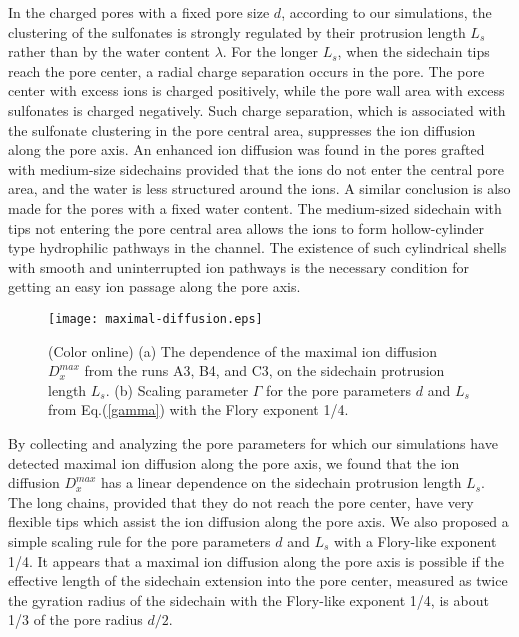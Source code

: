 \documentclass[3p,english,preprint]{elsarticle}
\begin{document}
In the charged pores with  a fixed pore size $d$, according to our simulations, 
the clustering of the sulfonates is strongly regulated
 by their protrusion length $L_s$ rather than by
the  water content $\lambda$.  
For the longer $L_s$, when the sidechain tips reach the pore center,   
a radial charge separation occurs in the pore. The pore center 
with excess ions is  charged positively, while the pore  wall area 
with excess sulfonates is charged negatively. Such  
 charge separation, which is associated with 
the sulfonate clustering in the pore central area,
 suppresses the ion diffusion along the pore axis. 
 An enhanced ion diffusion was found in  
the pores grafted with  medium-size sidechains provided that 
the  ions do not enter the central pore area, and the water is less structured 
around the ions. 
A similar conclusion is also made for the pores with a fixed water content. 
The medium-sized sidechain with tips not entering  the pore central area 
  allows the ions to form  hollow-cylinder type hydrophilic pathways in the 
channel. The existence of such cylindrical shells with smooth 
and uninterrupted 
ion pathways is the necessary condition for getting  
an easy  ion passage along the pore axis.

\begin{figure}[!ht]
\begin{center}
\texttt{[image: maximal-diffusion.eps]}
\end{center}
\vspace{-0.7cm}
\caption{(Color online) 
(a) The dependence of the maximal ion diffusion 
$D_x^{max}$ from the runs A3, B4, and C3, on the sidechain protrusion 
length $L_s$. (b) Scaling parameter $\Gamma$  for the pore parameters $d$ and $L_s$
from Eq.(\ref{gamma}) with the Flory exponent 1/4. 
 \label{fig-16-new}}
\end{figure}


By collecting and analyzing the pore parameters for which our simulations have detected 
 maximal ion diffusion along the pore axis, we found that the
 ion diffusion $D_x^{max}$ has a linear dependence on the sidechain 
protrusion length $L_s$. The long chains, provided that they do not 
reach the pore center, have very flexible tips which assist the 
ion diffusion along the pore axis.  We also proposed a simple scaling rule for the pore 
parameters $d$ and $L_s$ with a Flory-like exponent 1/4. It appears that 
a maximal ion diffusion along the pore axis is possible if the 
effective length of the sidechain extension into the pore center,
measured as twice the gyration radius of the sidechain with 
the Flory-like exponent 1/4, is about 1/3 of the pore radius $d/2$.  
\end{document}
